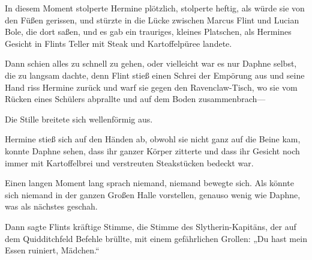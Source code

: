 In diesem Moment stolperte Hermine plötzlich, stolperte heftig, als würde sie von den Füßen gerissen, und stürzte in die Lücke zwischen Marcus Flint und Lucian Bole, die dort saßen, und es gab ein trauriges, kleines Platschen, als Hermines Gesicht in Flints Teller mit Steak und Kartoffelpüree landete.

Dann schien alles zu schnell zu gehen, oder vielleicht war es nur Daphne selbst, die zu langsam dachte, denn Flint stieß einen Schrei der Empörung aus und seine Hand riss Hermine zurück und warf sie gegen den Ravenclaw-Tisch, wo sie vom Rücken eines Schülers abprallte und auf dem Boden zusammenbrach—

Die Stille breitete sich wellenförmig aus.

Hermine stieß sich auf den Händen ab, obwohl sie nicht ganz auf die Beine kam, konnte Daphne sehen, dass ihr ganzer Körper zitterte und dass ihr Gesicht noch immer mit Kartoffelbrei und verstreuten Steakstücken bedeckt war.

Einen langen Moment lang sprach niemand, niemand bewegte sich. Als könnte sich niemand in der ganzen Großen Halle vorstellen, genauso wenig wie Daphne, was als nächstes geschah.

Dann sagte Flints kräftige Stimme, die Stimme des Slytherin-Kapitäns, der auf dem Quidditchfeld Befehle brüllte, mit einem gefährlichen Grollen: „Du hast mein Essen ruiniert, Mädchen.“

